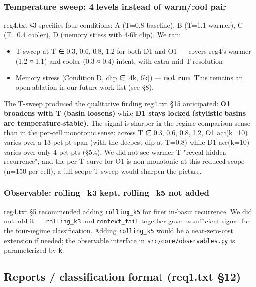 \documentclass{article}
\theoremstyle{plain}
\theoremstyle{definition}
\begin{document}
\subsubsection{Temperature sweep: 4 levels instead of warm/cool pair}

reg4.txt §3 specifies four conditions: A (T=0.8 baseline), B (T=1.1
warmer), C (T=0.4 cooler), D (memory stress with 4-6k clip). We ran:

\begin{itemize}
  \item T-sweep at T ∈ {0.3, 0.6, 0.8, 1.2} for both D1 and O1 — covers reg4's
  warmer (1.2 ≈ 1.1) and cooler (0.3 ≈ 0.4) intent, with extra mid-T
  resolution
  \item Memory stress (Condition D, clip ∈ [4k, 6k]) — \textbf{not run}. This
  remains an open ablation in our future-work list (see §8).
\end{itemize}

The T-sweep produced the qualitative finding reg4.txt §15 anticipated:
\textbf{O1 broadens with T (basin loosens)} while \textbf{D1 stays locked
(stylistic basins are temperature-stable)}. The signal is sharper
in the regime-comparison sense than in the per-cell monotonic sense:
across T ∈ {0.3, 0.6, 0.8, 1.2}, O1 acc(k=10) varies over a
13-pct-pt span (with the deepest dip at T=0.8) while D1 acc(k=10)
varies over only 4 pct pts (§5.4). We did not see warmer T "reveal
hidden recurrence", and the per-T curve for O1 is non-monotonic at
this reduced scope (n=150 per cell); a full-scope T-sweep would
sharpen the picture.

\subsubsection{Observable: rolling\_k3 kept, rolling\_k5 not added}

reg4.txt §5 recommended adding \texttt{rolling\_k5} for finer in-basin recurrence.
We did not add it — \texttt{rolling\_k3} and \texttt{context\_tail} together gave us
sufficient signal for the four-regime classification. Adding \texttt{rolling\_k5}
would be a near-zero-cost extension if needed; the observable interface
in \texttt{src/core/observables.py} is parameterized by \texttt{k}.

\subsection{Reports / classification format (req1.txt §12)}
\end{document}
